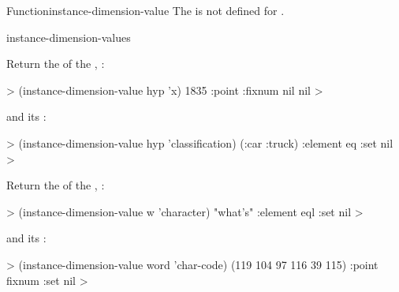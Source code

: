 \documentclass[10pt,twoside,english,pdftex]{article}
\begin{document}
\begin{functiondoc}{Function}{instance-dimension-value}
\fnerrors The   is not defined for
. 

\begin{alsos}{instance-dimension-values}
\end{alsos}

\fnexamples
%
Return the   of the ,
:
%
\W\supp
\begin{example}
  > (instance-dimension-value hyp 'x)
  1835
  :point
  :fixnum
  nil
  nil
  >
\end{example}
%
and its  :
%
\W\supp\notpretop
\begin{example}
  > (instance-dimension-value hyp 'classification)
  (:car :truck)
  :element
  eq
  :set
  nil
  >
\end{example}

Return the   of the
, :
%
\W\supp
\begin{example}
  > (instance-dimension-value w 'character)
  "what's"
  :element
  eql
  :set
  nil
  >
\end{example}
%
and its  :
%
\W\supp\notpretop
\begin{example}
  > (instance-dimension-value word 'char-code)
  (119 104 97 116 39 115)
  :point
  fixnum
  :set
  nil
  >
\end{example}

\end{functiondoc}

\end{document}
